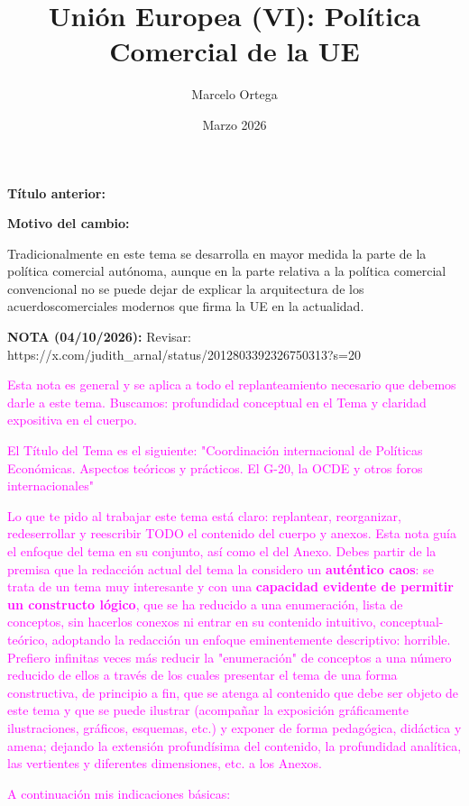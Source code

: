 \documentclass[10pt,a4paper]{article}
\title{Unión Europea (VI): Política Comercial de la UE\\
\large }
\author{Marcelo Ortega}
\date{Marzo 2026}
\newcommand{\puntosclave}[1]{%
  \begin{tcolorbox}[
    colframe=black,
    title={Puntos clave},
    before upper={\setlength{\parindent}{0.5cm}\setlength{\parskip}{0.5\baselineskip}}
  ]
  #1
  \end{tcolorbox}
}
\newcommand{\modificaciones}[1]{
  \begin{tcolorbox}[
    colback=white,
    colframe=red,
    title={Modificaciones a realizar},
    before upper={\setlength{\parindent}{0.5cm}\setlength{\parskip}{0.5\baselineskip}}
  ]
  #1
  \end{tcolorbox}
}
\newcommand{\changebox}{%
\begin{tcolorbox}[title={Historial de cambios del tema}]
\textbf{Título anterior:} \OldTitle\par
\textbf{Motivo del cambio:} \ChangeWhy
\end{tcolorbox}
}
\newcounter{anexo}
\begin{document}
\maketitle
\changebox

\newpage

\puntosclave{ %
     Tradicionalmente en este tema se desarrolla en mayor medida la parte de la política comercial autónoma, aunque en la parte relativa a la política comercial convencional no se puede dejar de explicar la arquitectura de los acuerdoscomerciales modernos que firma la UE en la actualidad.
    }
\vspace{1cm}

\modificaciones{
    \textbf{NOTA (04/10/2026):} Revisar: https://x.com/judith\_arnal/status/2012803392326750313?s=20

    \textcolor{magenta}{Esta nota es general y se aplica a todo el replanteamiento necesario que debemos darle a este tema. Buscamos: profundidad conceptual en el Tema y claridad expositiva en el cuerpo.

    El Título del Tema es el siguiente: "Coordinación internacional de Políticas Económicas. Aspectos teóricos y prácticos. El G-20, la OCDE y otros foros internacionales"

    Lo que te pido al trabajar este tema está claro: replantear, reorganizar, redeserrollar y reescribir TODO el contenido del cuerpo y anexos. Esta nota guía el enfoque del tema en su conjunto, así como el del Anexo. Debes partir de la premisa que la redacción actual del tema la considero un \textbf{auténtico caos}: se trata de un tema muy interesante y con una \textbf{capacidad evidente de permitir un constructo lógico}, que se ha reducido a una enumeración, lista de conceptos, sin hacerlos conexos ni entrar en su contenido intuitivo, conceptual-teórico, adoptando la redacción un enfoque eminentemente descriptivo: horrible. Prefiero infinitas veces más reducir la "enumeración" de conceptos a una número reducido de ellos a través de los cuales presentar el tema de una forma constructiva, de principio a fin, que se atenga al contenido que debe ser objeto de este tema y que se puede ilustrar (acompañar la exposición gráficamente ilustraciones, gráficos, esquemas, etc.) y exponer de forma pedagógica, didáctica y amena; dejando la extensión profundísima del contenido, la profundidad analítica, las vertientes y diferentes dimensiones, etc. a los Anexos.
    
    A continuación mis indicaciones básicas:
    
}}
\end{document}
